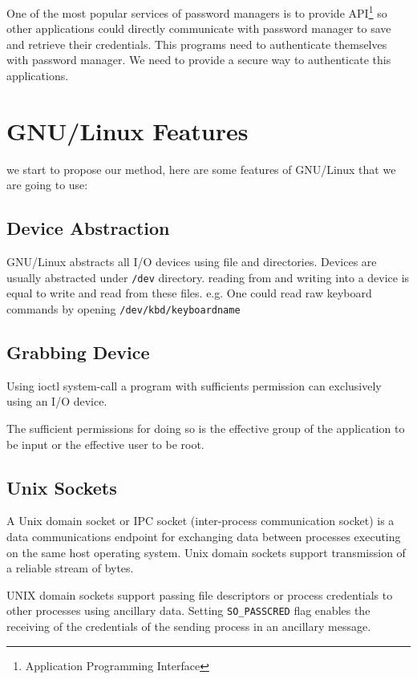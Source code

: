 \documentclass[journal]{IEEEtran}
\begin{document}
One of the most popular services of password managers is to provide API\footnote{Application Programming Interface} so other applications could directly communicate with password manager to save and retrieve their credentials. This programs need to authenticate themselves with password manager. We need to provide a secure way to authenticate this applications.

\section{GNU/Linux Features}

 we start to propose our method, here are some features of GNU/Linux that we are going to use:

\subsection{Device Abstraction}

GNU/Linux abstracts all I/O devices using file and directories. Devices are usually abstracted under \texttt{/dev} directory. reading from and writing into a device is equal to write and read from these files. e.g. One could read raw keyboard commands by opening \texttt{/dev/kbd/keyboardname} 

\subsection{Grabbing Device}

Using ioctl system-call a program with sufficients permission can exclusively using an I/O device. 

The sufficient permissions for doing so is the effective group of the application to be input or the effective user to be root.

\subsection{Unix Sockets}

A Unix domain socket or IPC socket (inter-process communication socket) is a data communications endpoint for exchanging data between processes executing on the same host operating system. Unix domain sockets support transmission of a reliable stream of bytes. \cite{wiki:unixsock}

UNIX domain sockets support passing file descriptors or process credentials to other processes using ancillary data. Setting \texttt{SO\_PASSCRED} flag enables the receiving of the credentials of the sending process in an ancillary message. \cite{linuxman:unix}
\end{document}
